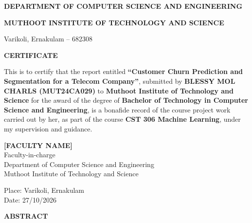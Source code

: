 \newpage
\thispagestyle{empty}
\begin{center}
    {\bfseries\LARGE DEPARTMENT OF COMPUTER SCIENCE AND ENGINEERING\par}
    {\bfseries\large MUTHOOT INSTITUTE OF TECHNOLOGY AND SCIENCE\par}
    {\large Varikoli, Ernakulam -- 682308\par}
    \vspace{1.0cm}
    {\bfseries\Large CERTIFICATE\par}
\end{center}

\vspace{0.8cm}
\noindent This is to certify that the report entitled \textbf{``Customer Churn Prediction and Segmentation for a Telecom Company''}, submitted by \textbf{BLESSY MOL CHARLS (MUT24CA029)} to \textbf{Muthoot Institute of Technology and Science} for the award of the degree of \textbf{Bachelor of Technology in Computer Science and Engineering}, is a bonafide record of the course project work carried out by her, as part of the course \textbf{CST 306 Machine Learning}, under my supervision and guidance.

\vspace{3.5cm}
\begin{flushright}
    \textbf{[FACULTY NAME]}\\[0.15cm]
    Faculty-in-charge\\
    Department of Computer Science and Engineering\\
    Muthoot Institute of Technology and Science
\end{flushright}

\vspace{2.0cm}
\noindent Place: Varikoli, Ernakulam\\
Date: 27/10/2026

\newpage
{}
\setcounter{page}{2}

\begin{center}
    {\bfseries\Large ABSTRACT\par}
\end{center}
\vspace{0.2cm}

